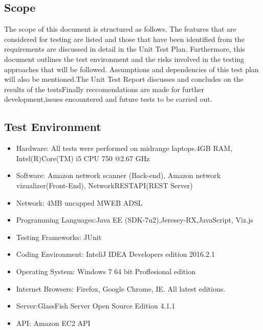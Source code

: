 \documentclass[hidelinks,a4paper,12pt]{article}
\begin{document}
\subsection{Scope}
The scope of this document is structured as follows. The features that are considered for
testing are listed and those that have been identified from the requirements are
discussed in detail in the Unit Test Plan. Furthermore, this document outlines the test environment
and the risks involved in the testing approaches that will be followed. Assumptions and
dependencies of this test plan will also be mentioned.The Unit Test Report
discusses and concludes on the results of the testsFinally reccomendations are made for further development,issues encountered and future tests to be carried out.

\subsection{ Test Environment}



\begin{itemize}
  \item Hardware: All tests were performed on midrange laptops.4GB RAM, Intel(R)Core(TM) i5 CPU 750 @2.67 GHz
\item Software: Amazon network scanner (Back-end), Amazon network vizualizer(Front-End), NetworkRESTAPI(REST Server)
\item Network: 4MB uncapped MWEB ADSL
  \item Programming Languages:Java EE (SDK-7u2),Jeresey-RX,JavaScript, Viz.js
  \item Testing Frameworks: JUnit
\item Coding Environment: InteliJ IDEA Developers edition 2016.2.1
\item Operating System: Windows 7 64 bit Proffesional edition
\item Internet Browsers: Firefox, Google Chrome, IE. All latest editions. 
\item Server:GlassFish Server Open Source Edition 4.1.1 
\item API: Amazon EC2 API 
\end{itemize}
\end{document}
